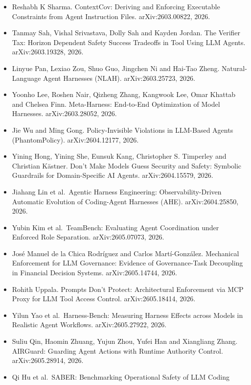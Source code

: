 \documentclass[
]{article}
\begin{document}
\begin{itemize}
  Specification and Runtime Enforcement for Reliable Autonomous AI
  Agents. arXiv:2602.22302, 2026.
\item
  Reshabh K Sharma. ContextCov: Deriving and Enforcing Executable
  Constraints from Agent Instruction Files. arXiv:2603.00822, 2026.
\item
  Tanmay Sah, Vishal Srivastava, Dolly Sah and Kayden Jordan. The
  Verifier Tax: Horizon Dependent Safety Success Tradeoffs in Tool Using
  LLM Agents. arXiv:2603.19328, 2026.
\item
  Linyue Pan, Lexiao Zou, Shuo Guo, Jingchen Ni and Hai-Tao Zheng.
  Natural-Language Agent Harnesses (NLAH). arXiv:2603.25723, 2026.
\item
  Yoonho Lee, Roshen Nair, Qizheng Zhang, Kangwook Lee, Omar Khattab and
  Chelsea Finn. Meta-Harness: End-to-End Optimization of Model
  Harnesses. arXiv:2603.28052, 2026.
\item
  Jie Wu and Ming Gong. Policy-Invisible Violations in LLM-Based Agents
  (PhantomPolicy). arXiv:2604.12177, 2026.
\item
  Yining Hong, Yining She, Eunsuk Kang, Christopher S. Timperley and
  Christian Kästner. Don't Make Models Guess Security and Safety:
  Symbolic Guardrails for Domain-Specific AI Agents. arXiv:2604.15579,
  2026.
\item
  Jiahang Lin et al.~Agentic Harness Engineering: Observability-Driven
  Automatic Evolution of Coding-Agent Harnesses (AHE). arXiv:2604.25850,
  2026.
\item
  Yubin Kim et al.~TeamBench: Evaluating Agent Coordination under
  Enforced Role Separation. arXiv:2605.07073, 2026.
\item
  José Manuel de la Chica Rodríguez and Carlos Martí-González.
  Mechanical Enforcement for LLM Governance: Evidence of Governance-Task
  Decoupling in Financial Decision Systems. arXiv:2605.14744, 2026.
\item
  Rohith Uppala. Prompts Don't Protect: Architectural Enforcement via
  MCP Proxy for LLM Tool Access Control. arXiv:2605.18414, 2026.
\item
  Yilun Yao et al.~Harness-Bench: Measuring Harness Effects across
  Models in Realistic Agent Workflows. arXiv:2605.27922, 2026.
\item
  Suliu Qin, Haomin Zhuang, Yujun Zhou, Yufei Han and Xiangliang Zhang.
  AIRGuard: Guarding Agent Actions with Runtime Authority Control.
  arXiv:2605.28914, 2026.
\item
  Qi Hu et al.~SABER: Benchmarking Operational Safety of LLM Coding

\end{itemize}
\end{document}
